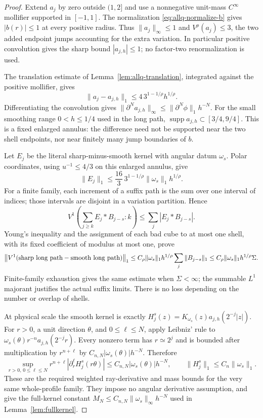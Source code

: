\documentclass[11pt]{article}
\numberwithin{equation}{section}
\theoremstyle{remark}
\theoremstyle{definition}
\newcommand{\supp}{\operatorname{supp}}
\begin{document}
\begin{proof}
Extend $a_j$ by zero outside $(1,2]$ and use a nonnegative unit-mass
$C^\infty$ mollifier supported in $[-1,1]$.  The normalization
\eqref{eq:allq-normalize-b} gives $|b(r)|\le1$ at every positive radius.
Thus $\|a_j\|_\infty\le1$ and $V^\rho(a_j)\le3$, the two added
endpoint jumps accounting for the extra variation.  In particular
positive convolution gives the sharp bound $|a_{j,h}|\le1$; no
factor-two renormalization is used.

The translation estimate of Lemma~\ref{lem:allq-translation}, integrated
against the positive mollifier, gives
\[
 \|a_j-a_{j,h}\|_1
 \le4\,3^{1-1/\rho}h^{1/\rho}.
\]
Differentiating the convolution gives
$\|\partial^Na_{j,h}\|_\infty\le\|\partial^N\phi\|_1h^{-N}$.
For the small smoothing range $0<h\le1/4$ used in the long path,
$\supp a_{j,h}\subset[3/4,9/4]$.  This is a fixed enlarged annulus:
the difference need not be supported near the two shell endpoints,
nor near finitely many jump boundaries of $b$.

Let $E_j$ be the literal sharp-minus-smooth kernel with angular datum
$\omega_s$.  Polar coordinates, using $u^{-1}\le4/3$ on this enlarged
annulus, give
\[
 \|E_j\|_1\le\frac{16}{3}\,3^{1-1/\rho}
          \|\omega_s\|_1h^{1/\rho}.
\]
For a finite family, each increment of a suffix path is the sum over
one interval of indices; those intervals are disjoint in a variation
partition.  Hence
\[
 V^1\left(\sum_{j\ge k}E_j*B_{j-s}:k\right)
 \le\sum_j|E_j*B_{j-s}|.
\]
Young's inequality and the assignment of each bad cube to at most one
shell, with its fixed coefficient of modulus at most one, prove
\[
 \left\|V^1(\hbox{sharp long path}-\hbox{smooth long path})\right\|_1
 \le C_\rho\|\omega_s\|_1h^{1/\rho}
       \sum_j\|B_{j-s}\|_1
 \le C_\rho\|\omega_s\|_1h^{1/\rho}\Sigma.
\]
Finite-family exhaustion gives the same estimate when $\Sigma<\infty$;
the summable $L^1$ majorant justifies the actual suffix limits.
There is no loss depending on the number or overlap of shells.

At physical scale the smooth kernel is exactly
$H_j^s(z)=K_{\omega_s}(z)a_{j,h}(2^{-j}|z|)$.
For $r>0$, a unit direction $\theta$, and $0\le\ell\le N$, apply
Leibniz' rule to
$\omega_s(\theta)r^{-n}a_{j,h}(2^{-j}r)$.
Every nonzero term has $r\simeq2^j$ and is bounded after multiplication
by $r^{n+\ell}$ by $C_{n,N}|\omega_s(\theta)|h^{-N}$.
Therefore
\[
 \sup_{r>0,\,0\le\ell\le N}
 r^{n+\ell}|\partial_r^\ell H_j^s(r\theta)|
 \le C_{n,N}|\omega_s(\theta)|h^{-N},\qquad
 \|H_j^s\|_1\le C_n\|\omega_s\|_1.
\]
These are the required weighted ray-derivative and mass bounds for
the very same whole-profile family.  They impose no angular derivative
assumption, and give the full-kernel constant
$M_N\le C_{n,N}\|\omega_s\|_\infty h^{-N}$ used in
Lemma~\ref{lem:fullkernel}.
\end{proof}
\end{document}
